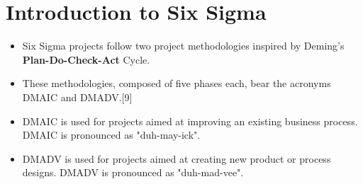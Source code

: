 \documentclass{beamer}
\begin{document}
\section{Introduction to Six Sigma}
\begin{frame}
\Large
\begin{itemize}
\item Six Sigma projects follow two project methodologies inspired by 
Deming's \textbf{Plan-Do-Check-Act} Cycle. 
\item These methodologies, composed of five phases each, bear the acronyms DMAIC and DMADV.[9]

\item DMAIC is used for projects aimed at improving an existing business process. DMAIC is pronounced as "duh-may-ick".
\item DMADV is used for projects aimed at creating new product or process designs. DMADV is pronounced as "duh-mad-vee".
\end{itemize}
\end{frame}
\end{document}
